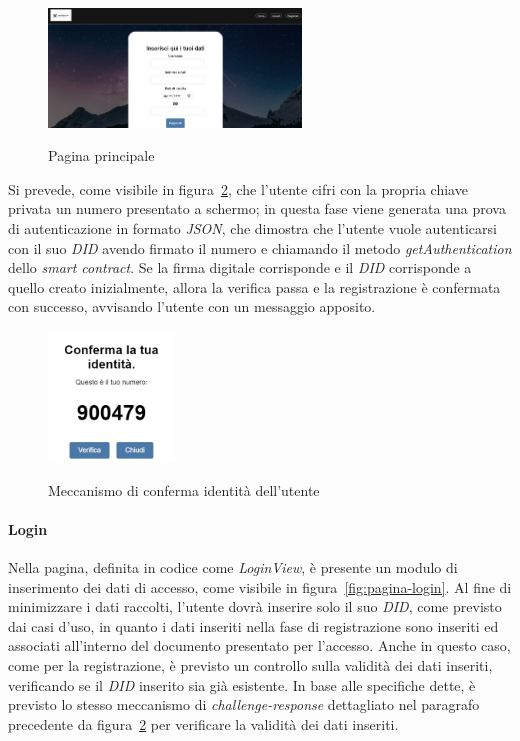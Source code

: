 \begin{figure}[ht]
    \centering
    \includegraphics[width=0.6\textwidth, alt={Pagina principale dell'applicazione}]{immagini/frontend/register.png}
    \caption{Pagina principale}\label{fig:pagina-registrazione}
\end{figure}

Si prevede, come visibile in figura~\ref{fig:sfida}, che l'utente cifri con la propria chiave privata un numero presentato a schermo;
in questa fase viene generata una prova di autenticazione in formato \textit{JSON}, che dimostra che l'utente vuole autenticarsi con il suo \textit{DID} avendo firmato il numero
e chiamando il metodo \textit{getAuthentication} dello \textit{smart contract}.
Se la firma digitale corrisponde e il \textit{DID} corrisponde a quello creato inizialmente, allora la verifica passa e la registrazione è confermata con successo, 
avvisando l'utente con un messaggio apposito. 

\begin{figure}[ht]
    \centering
    \includegraphics[width=0.3\textwidth, alt={Meccanismo di sfida per conferma dell'identità dell'utente}]{immagini/frontend/challenge-response.png}
    \caption{Meccanismo di conferma identità dell'utente}\label{fig:sfida}
\end{figure}

\newpage
\paragraph{Login}
Nella pagina, definita in codice come \textit{LoginView}, è presente un modulo di inserimento dei dati di accesso, come visibile in figura~\ref{fig:pagina-login}.
Al fine di minimizzare i dati raccolti, l'utente dovrà inserire solo il suo \textit{DID}, come previsto dai casi d'uso, 
in quanto i dati inseriti nella fase di registrazione sono inseriti ed associati all'interno del documento presentato per l'accesso.
Anche in questo caso, come per la registrazione, è previsto un controllo sulla validità dei dati inseriti, verificando se il \textit{DID} inserito sia già esistente.
In base alle specifiche dette, è previsto lo stesso meccanismo di \textit{challenge-response} dettagliato nel paragrafo precedente da figura~\ref{fig:sfida}
per verificare la validità dei dati inseriti.

